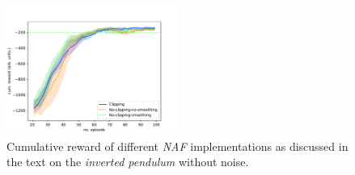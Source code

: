 \documentclass[
reprint,
amsmath,amssymb,amsfonts,clevref,
aps,
prstab,
]{revtex4-2}
\begin{document}
	\begin{figure}[!h]
	\centering
	\includegraphics*[width=0.5\textwidth]{Figures/Comparison_naf}
	\caption{Cumulative reward of different \emph{NAF} implementations as discussed in the text on the \emph{inverted pendulum} without noise.}
	\label{fig:comparsion_smoothing_small}
\end{figure}
\end{document}
